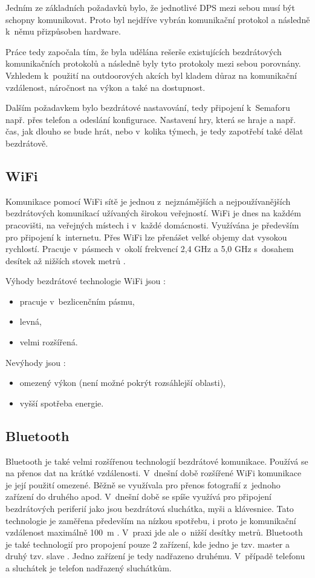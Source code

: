 Jedním ze základních požadavků bylo, že jednotlivé DPS mezi sebou musí být schopny komunikovat. Proto byl nejdříve vybrán komunikační 
protokol a následně k~němu přizpůsoben hardware. 

Práce tedy započala tím, že byla udělána rešerše existujících bezdrátových komunikačních protokolů a následně byly tyto protokoly 
mezi sebou porovnány. Vzhledem k~použití na outdoorových akcích byl kladem důraz na komunikační vzdálenost, náročnost na výkon 
a také na dostupnost. 

Dalším požadavkem bylo bezdrátové nastavování, tedy připojení k~Semaforu např. přes telefon a odeslání konfigurace. Nastavení hry,
která se hraje a např. čas, jak dlouho se bude hrát, nebo v~kolika týmech, je tedy zapotřebí také dělat bezdrátově. 

\subsection{WiFi}
Komunikace pomocí WiFi sítě je jednou z~nejznámějších a nejpoužívanějších bezdrátových komunikací užívaných širokou veřejností. 
WiFi je dnes na každém pracovišti, na veřejných místech i v~každé domácnosti. Využívána je především pro připojení k~internetu. 
Přes WiFi lze přenášet velké objemy dat vysokou rychlostí. Pracuje v~pásmech v~okolí frekvencí 2,4 GHz a 5,0 GHz s~dosahem 
desítek až nižších stovek metrů \cite{Bezdrat_muni}. 

Výhody bezdrátové technologie WiFi jsou \cite{Bezdrat_muni}:
\begin{itemize}
  \item pracuje v~bezlicenčním pásmu, 
  \item levná, 
  \item velmi rozšířená.
\end{itemize}

Nevýhody jsou \cite{Bezdrat_muni}:
\begin{itemize}
  \item omezený výkon (není možné pokrýt rozsáhlejší oblasti), 
  \item vyšší spotřeba energie.
\end{itemize}

\subsection{Bluetooth}
Bluetooth je také velmi rozšířenou technologií bezdrátové komunikace. Používá se na přenos dat na krátké vzdálenosti. V~dnešní době 
rozšířené WiFi komunikace je její použití omezené. Běžně se využívala pro přenos fotografií z~jednoho zařízení do druhého apod. V~dnešní 
době se spíše využívá pro připojení bezdrátových periferií jako jsou bezdrátová sluchátka, myši a klávesnice. Tato technologie je zaměřena 
především na nízkou spotřebu, i proto je komunikační vzdálenost maximálně 100~m \cite{Bezdrat_muni}. V~praxi jde ale o~nižší desítky
metrů. Bluetooth je také technologií pro propojení pouze 2 zařízení, kde jedno je tzv. master a druhý tzv. slave \cite{Bezdrat_muni}. 
Jedno zařízení je tedy nadřazeno druhému. V~případě telefonu a sluchátek je telefon nadřazený sluchátkům. 

